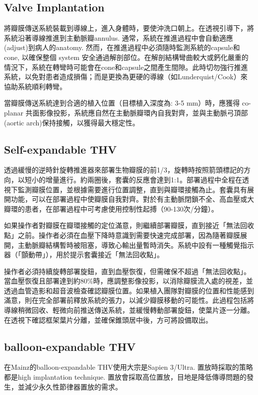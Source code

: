 \documentclass[nols]{tufte-book}
\begin{document}
\subsection{Valve Implantation}
將瓣膜傳送系統裝載到導線上，進入身體時，要使沖洗口朝上。在透視引導下，將系統沿著導線推進到主動脈瓣annulus. 通常，系統在推進過程中會自動適應 (adjust)到病人的anatomy. 然而，在推進過程中必須隨時監測系統的capsule和 cone, 以確保整個 system 安全通過解剖部位。在解剖結構彎曲較大或鈣化嚴重的情況下，系統在轉彎時可能會在cone和capsule之間產生間隙。此時切勿強行推進系統，以免對患者造成損傷；而是更換為更硬的導線（如Lunderquist/Cook）來協助系統順利轉彎。

當瓣膜傳送系統達到合適的植入位置（目標植入深度為: 3-5 mm）時，應獲得 co-planar 共面影像投影，系統應自然在主動脈瓣環內自我對齊，並與主動脈弓頂部 (aortic arch)保持接觸，以獲得最大穩定性。

\subsection{Self-expandable THV}
透過緩慢的逆時針旋轉推進器來部署生物瓣膜的前1/3，旋轉時按照箭頭標記的方向，以短小的增量進行。約兩圈後，套囊的反應會達到1:1。部署過程中全程在透視下監測瓣膜位置，並根據需要進行位置調整，直到與瓣環接觸為止。套囊具有展開功能，可以在部署過程中使瓣膜自我對齊。對於有主動脈閉鎖不全、高血壓或大瓣環的患者，在部署過程中可考慮使用控制性起搏（90-130次/分鐘）。

如果操作者對瓣膜在瓣環接觸的定位滿意，則繼續部署瓣膜，直到接近「無法回收點」之前。操作者必須在血壓下降時意識到需要快速完成部署，因為隨著瓣膜展開，主動脈瓣結構暫時被阻塞，導致心輸出量暫時消失。系統中設有一種觸覺指示器（「顫動帶」），用於提示套囊接近「無法回收點」。

操作者必須持續旋轉部署旋鈕，直到血壓恢復，但需確保不超過「無法回收點」。當血壓恢復且部署達到約80\%時，應調整影像投影，以消除瓣膜流入處的視差，並透過血管造影和超音波檢查確認瓣膜位置。如果植入團隊對瓣膜的位置和性能感到滿意，則在完全部署前釋放系統的張力，以減少瓣膜移動的可能性。此過程包括將導線稍微回收、輕微向前推送傳送系統，並緩慢轉動部署旋鈕，使葉片逐一分離。在透視下確認框架葉片分離，並確保錐頭居中後，方可將設備取出。

\subsection{balloon-expandable THV}
在Mainz的balloon-expandable THV使用大宗是Sapien 3/Ultra. 置放時採取的策略都是high implantation technique.\cite{Ochiai2023} 置放會採取高位置放，目地是降低傳導問題的發生，並減少永久性節律器置放的需求。
\end{document}
